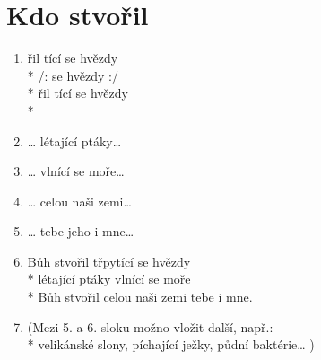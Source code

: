 \section{Kdo stvořil}
\begin{enumerate}
\item {} řil tící se hvězdy \\*
/:  se hvězdy :/ \\*
 řil tící se hvězdy \\*
  
\item … létající ptáky…
\item … vlnící se moře… 
\item … celou naši zemi… 
\item … tebe jeho i mne… 
\item Bůh stvořil třpytící se hvězdy \\*
létající ptáky vlnící se moře \\*
Bůh stvořil celou naši zemi tebe i mne. 
\item[] (Mezi 5. a 6. sloku          možno vložit další, např.: \\*
velikánské slony, píchající ježky, půdní baktérie… )
\end{enumerate}
